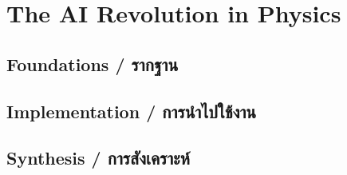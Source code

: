 \chapter{The AI Revolution in Physics}
\label{ch:intro_ai_physics}

\section{Foundations \quad / \quad \textthai{รากฐาน}}



\section{Implementation \quad / \quad \textthai{การนำไปใช้งาน}}



\section{Synthesis \quad / \quad \textthai{การสังเคราะห์}}



